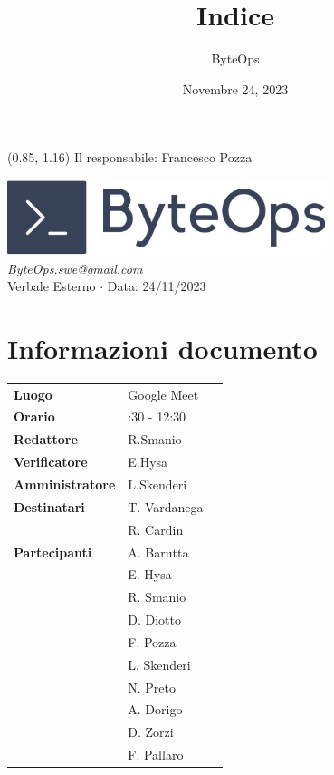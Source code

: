 \documentclass{article}
\title{\textbf{\fontsize{28}{6}\selectfont Indice}}
\author{\fontsize{14}{6}\selectfont ByteOps}
\date{Novembre 24, 2023}
\begin{document}
\begin{textblock*}{\textwidth}(0.85\textwidth, 1.16\textheight)
    Il responsabile: Francesco Pozza
\end{textblock*}

\pagestyle{fancy}
\begin{center}
\includegraphics[width = 0.7\textwidth]{../../../Images/logo.png} \\
\vspace{0.2cm}
\textcolor[RGB]{60, 60, 60}{\textit{ByteOps.swe@gmail.com}} \\
\vspace{1cm}
\fontsize{16}{6}\selectfont Verbale Esterno $\cdot$ Data: 24/11/2023 \\
\vspace{0.5cm}
\end{center}

\section*{Informazioni documento}
\def\arraystretch{1.2}
\begin{tabular}{>{\raggedleft\arraybackslash}p{}|>{\raggedright\arraybackslash}p{}c}
\hline
\addlinespace
\textbf{Luogo} & Google Meet \vspace{10pt} \\
\textbf{Orario} & 11:30 - 12:30 \vspace{10pt} \\
\textbf{Redattore} & R.Smanio \vspace{10pt} \\
\textbf{Verificatore} & E.Hysa \vspace{10pt} \\
\textbf{Amministratore} & L.Skenderi \vspace{10pt} \\
\textbf{Destinatari} & T. Vardanega \\ & R. Cardin \vspace{10pt} \\
\textbf{Partecipanti} & A. Barutta \\ & E. Hysa \\ & R. Smanio \\ & D. Diotto \\ & F. Pozza \\ & L. Skenderi \\ & N. Preto \\ & A. Dorigo \\ & D. Zorzi \\ & F. Pallaro \vspace{10pt} \\
\end{tabular}
\pagebreak 
\end{document}
